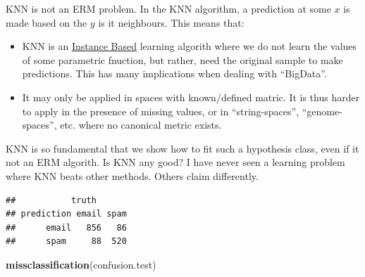 \documentclass[]{book}
\newenvironment{Shaded}{\begin{snugshade}}{\end{snugshade}}
\newcommand{\KeywordTok}[1]{\textcolor[rgb]{0.13,0.29,0.53}{\textbf{#1}}}
\newcommand{\DataTypeTok}[1]{\textcolor[rgb]{0.13,0.29,0.53}{#1}}
\newcommand{\DecValTok}[1]{\textcolor[rgb]{0.00,0.00,0.81}{#1}}
\newcommand{\StringTok}[1]{\textcolor[rgb]{0.31,0.60,0.02}{#1}}
\newcommand{\CommentTok}[1]{\textcolor[rgb]{0.56,0.35,0.01}{\textit{#1}}}
\newcommand{\OperatorTok}[1]{\textcolor[rgb]{0.81,0.36,0.00}{\textbf{#1}}}
\newcommand{\NormalTok}[1]{#1}
\providecommand{\tightlist}{%
  \setlength{\itemsep}{0pt}\setlength{\parskip}{0pt}}
\theoremstyle{definition}
\theoremstyle{definition}
\theoremstyle{definition}
\theoremstyle{remark}
\begin{document}
KNN is not an ERM problem. In the KNN algorithm, a prediction at some
\(x\) is made based on the \(y\) is it neighbours. This means that:

\begin{itemize}
\tightlist
\item
  KNN is an
  \href{https://en.wikipedia.org/wiki/Instance-based_learning}{Instance
  Based} learning algorith where we do not learn the values of some
  parametric fnuction, but rather, need the original sample to make
  predictions. This has many implications when dealing with ``BigData''.
\item
  It may only be applied in spaces with known/defined matric. It is thus
  harder to apply in the presence of missing values, or in
  ``string-spaces'', ``genome-spaces'', etc. where no canonical metric
  exists.
\end{itemize}

KNN is so fundamental that we show how to fit such a hypothesis class,
even if it not an ERM algorith. Is KNN any good? I have never seen a
learning problem where KNN beats other methods. Others claim
differently.

\begin{Shaded}
\end{Shaded}

\begin{verbatim}
##           truth
## prediction email spam
##      email   856   86
##      spam     88  520
\end{verbatim}

\begin{Shaded}
\begin{Highlighting}[]
\KeywordTok{missclassification}\NormalTok{(confusion.test)}
\end{Highlighting}
\end{Shaded}
\end{document}

